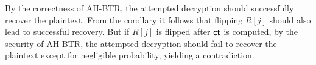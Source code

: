 By the correctness of AH-BTR,
the attempted decryption should successfully recover the plaintext.
From the corollary it follows that flipping $R[j]$ should also lead to successful recovery.
But if $R[j]$ is flipped after $\ct$ is computed,
by the security of AH-BTR,
the attempted decryption should fail to recover the plaintext except for negligible probability, yielding a contradiction.
